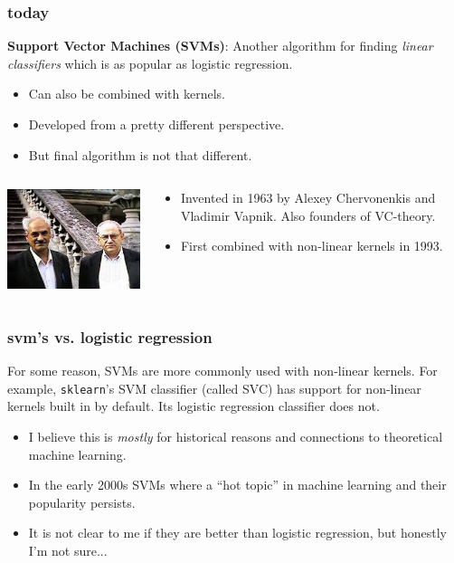 \documentclass[handout,compress]{beamer}
\begin{document}
\begin{frame} 
	\frametitle{today}
	\textbf{Support Vector Machines (SVMs)}:
	Another algorithm for finding \emph{linear classifiers} which is as popular as logistic regression. 
	\begin{itemize}
		\item Can also be combined with kernels.
		\item Developed from a pretty different perspective.
		\item But final algorithm is not that different. 
	\end{itemize}

\begin{columns}
	\begin{column}{.5\textwidth}
		\centering
		\includegraphics[width=.8\textwidth]{vc.jpeg}
	\end{column}
	\begin{column}{.5\textwidth}
		\small
		\begin{itemize}
		\item Invented in 1963 by Alexey Chervonenkis and Vladimir Vapnik. Also founders of VC-theory.
		\item First combined with non-linear kernels in 1993. 
		\end{itemize}
	\end{column}		
\end{columns}
\end{frame}

\begin{frame}
	\frametitle{svm's vs. logistic regression}
	For some reason, SVMs are more commonly used with non-linear kernels. For example, \texttt{sklearn}'s SVM classifier (called SVC) has support for non-linear kernels built in by default. Its logistic regression classifier does not. 
	
	\begin{itemize}
		\item I believe this is \emph{mostly} for historical reasons and connections to theoretical machine learning.
		\item In the early 2000s SVMs where a ``hot topic'' in machine learning and their popularity persists.
		\item It is not clear to me if they are better than logistic regression, but honestly I'm not sure... 
	\end{itemize}
\end{frame}
\end{document}

